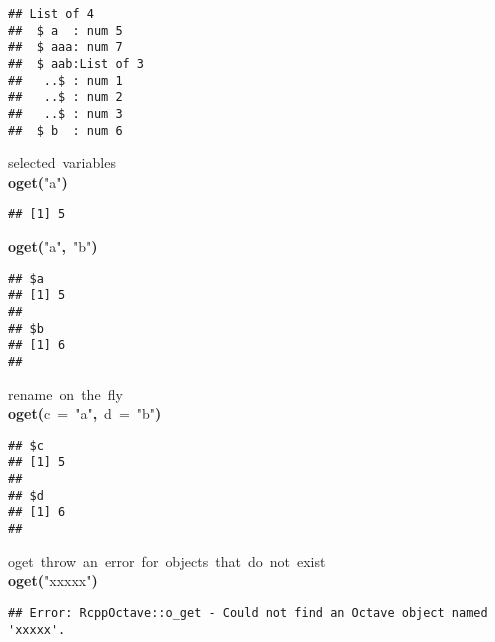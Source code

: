 \documentclass[english,10pt,a4paper]{article}\usepackage{graphicx, color}
\makeatletter
\newcommand{\hlfunctioncall}[1]{\textcolor[rgb]{0.501960784313725,0,0.329411764705882}{\textbf{#1}}}%
\newcommand{\hlstring}[1]{\textcolor[rgb]{0.6,0.6,1}{#1}}%
\newcommand{\hlkeyword}[1]{\textcolor[rgb]{0,0,0}{\textbf{#1}}}%
\newcommand{\hlargument}[1]{\textcolor[rgb]{0.690196078431373,0.250980392156863,0.0196078431372549}{#1}}%
\newcommand{\hlcomment}[1]{\textcolor[rgb]{0.180392156862745,0.6,0.341176470588235}{#1}}%
\newcommand{\hlstd}[1]{\textcolor[rgb]{0,0,0}{#1}}%
\newenvironment{kframe}{%
 \def\FrameCommand##1{\hskip\@totalleftmargin \hskip-\fboxsep
 \colorbox{shadecolor}{##1}\hskip-\fboxsep
     \hskip-\linewidth \hskip-\@totalleftmargin \hskip\columnwidth}%
 \MakeFramed {\advance\hsize-\width
   \@totalleftmargin\z@ \linewidth\hsize
   \@setminipage}}%
 {\par\unskip\endMakeFramed}
\newenvironment{knitrout}{}{} %
\makeatother
\begin{document}
\begin{knitrout}
\begin{kframe}
\begin{flushleft}
\normalfont
\end{flushleft}
\begin{verbatim}
## List of 4
##  $ a  : num 5
##  $ aaa: num 7
##  $ aab:List of 3
##   ..$ : num 1
##   ..$ : num 2
##   ..$ : num 3
##  $ b  : num 6
\end{verbatim}
\begin{flushleft}
\ttfamily\noindent
\hlcomment{\usebox{\hlnormalsizeboxhash}{\ }selected{\ }variables}\hspace*{\fill}\\
\hlstd{}\hlfunctioncall{o\usebox{\hlnormalsizeboxunderscore}get}\hlkeyword{(}\hlstring{"{}a"{}}\hlkeyword{)}\mbox{}
\normalfont
\end{flushleft}
\begin{verbatim}
## [1] 5
\end{verbatim}
\begin{flushleft}
\ttfamily\noindent
\hlfunctioncall{o\usebox{\hlnormalsizeboxunderscore}get}\hlkeyword{(}\hlstring{"{}a"{}}\hlkeyword{,}{\ }\hlstring{"{}b"{}}\hlkeyword{)}\mbox{}
\normalfont
\end{flushleft}
\begin{verbatim}
## $a
## [1] 5
## 
## $b
## [1] 6
## 
\end{verbatim}
\begin{flushleft}
\ttfamily\noindent
\hlcomment{\usebox{\hlnormalsizeboxhash}{\ }rename{\ }on{\ }the{\ }fly}\hspace*{\fill}\\
\hlstd{}\hlfunctioncall{o\usebox{\hlnormalsizeboxunderscore}get}\hlkeyword{(}\hlargument{c}{\ }\hlargument{=}{\ }\hlstring{"{}a"{}}\hlkeyword{,}{\ }\hlargument{d}{\ }\hlargument{=}{\ }\hlstring{"{}b"{}}\hlkeyword{)}\mbox{}
\normalfont
\end{flushleft}
\begin{verbatim}
## $c
## [1] 5
## 
## $d
## [1] 6
## 
\end{verbatim}
\begin{flushleft}
\ttfamily\noindent
\hlcomment{\usebox{\hlnormalsizeboxhash}{\ }o\usebox{\hlnormalsizeboxunderscore}get{\ }throw{\ }an{\ }error{\ }for{\ }objects{\ }that{\ }do{\ }not{\ }exist}\hspace*{\fill}\\
\hlstd{}\hlfunctioncall{o\usebox{\hlnormalsizeboxunderscore}get}\hlkeyword{(}\hlstring{"{}xxxxx"{}}\hlkeyword{)}\mbox{}
\normalfont
\end{flushleft}
\begin{verbatim}
## Error: RcppOctave::o_get - Could not find an Octave object named 'xxxxx'.

\end{verbatim}
\end{kframe}
\end{knitrout}
\end{document}
